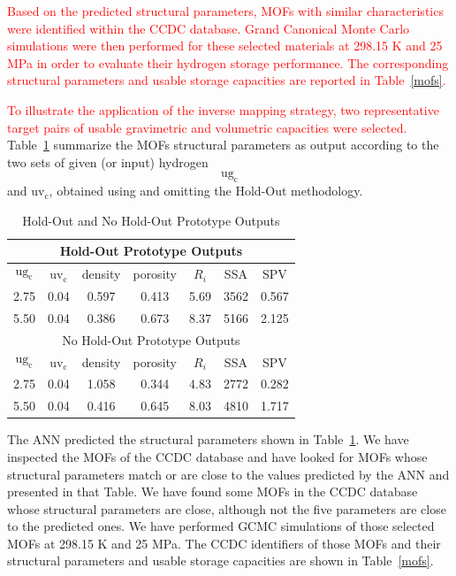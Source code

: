 \documentclass[review]{elsarticle}
\newcommand{\ugc}{$\mathrm{ug_c}$}
\newcommand{\uvc}{\mathrm{uv_c}}
\begin{document}
{\textcolor{red}{Based on the predicted structural parameters, MOFs with similar characteristics were identified within the CCDC database.
Grand Canonical Monte Carlo simulations were then performed for these selected materials at 298.15 K and 25 MPa in order to evaluate their hydrogen storage performance.
The corresponding structural parameters and usable storage capacities are reported in Table~\ref{mofs}.
}

\textcolor{red}{To illustrate the application of the inverse mapping strategy, two representative target pairs of usable gravimetric and volumetric capacities were selected.
}
Table~\ref{outputs} summarize the MOFs structural parameters as output according to the two sets of given (or input) hydrogen $\ugc$ and $\uvc$, obtained using and omitting the Hold-Out methodology.

\begin{table}[H]
    \centering
    \begin{tabular}{ccccccc}
    \hline
\multicolumn{7}{c}{Hold-Out Prototype Outputs}\\
\hline
         $\ugc$   & $\uvc$   & density & porosity & $R_i$ & SSA  & SPV\\
         2.75  & 0.04  & 0.597   & 0.413    & 5.69  & 3562 & 0.567\\
         5.50  & 0.04  & 0.386   & 0.673    & 8.37  & 5166 & 2.125\\
    \hline
\multicolumn{7}{c}{No Hold-Out Prototype Outputs}\\
\hline
         $\ugc$   & $\uvc$   &  density &  porosity &  $R_i$ & SSA  & SPV\\
         2.75  & 0.04  &  1.058   &  0.344    &  4.83  & 2772 & 0.282\\
         5.50  & 0.04  &  0.416   &  0.645    &  8.03  & 4810 & 1.717\\
    \hline
    \end{tabular}
    \caption{Hold-Out and No Hold-Out Prototype Outputs}
    \label{outputs}
\end{table}

The ANN predicted the structural parameters shown in Table~\ref{outputs}. We have inspected the MOFs of the CCDC database and 
have looked for MOFs whose structural parameters match or are close 
to the values predicted by the ANN and presented in that Table. We have found some MOFs in the CCDC database whose structural parameters are close, although not the five parameters are close to the predicted ones. We have performed GCMC simulations of those selected MOFs at 298.15 K and 25 MPa. The CCDC identifiers of those MOFs and their structural parameters and usable storage capacities are shown in Table~\ref{mofs}.

}
\end{document}
